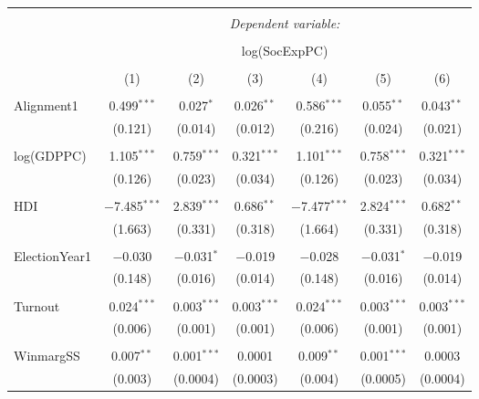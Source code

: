 
\begin{table}[!htbp] \centering 
  \caption{} 
  \label{} 
\begin{tabular}{@{\extracolsep{5pt}}lcccccc} 
\\[-1.8ex]\hline 
\hline \\[-1.8ex] 
 & \multicolumn{6}{c}{\textit{Dependent variable:}} \\ 
\cline{2-7} 
\\[-1.8ex] & \multicolumn{6}{c}{log(SocExpPC)} \\ 
\\[-1.8ex] & (1) & (2) & (3) & (4) & (5) & (6)\\ 
\hline \\[-1.8ex] 
 Alignment1 & 0.499$^{***}$ & 0.027$^{*}$ & 0.026$^{**}$ & 0.586$^{***}$ & 0.055$^{**}$ & 0.043$^{**}$ \\ 
  & (0.121) & (0.014) & (0.012) & (0.216) & (0.024) & (0.021) \\ 
  & & & & & & \\ 
 log(GDPPC) & 1.105$^{***}$ & 0.759$^{***}$ & 0.321$^{***}$ & 1.101$^{***}$ & 0.758$^{***}$ & 0.321$^{***}$ \\ 
  & (0.126) & (0.023) & (0.034) & (0.126) & (0.023) & (0.034) \\ 
  & & & & & & \\ 
 HDI & $-$7.485$^{***}$ & 2.839$^{***}$ & 0.686$^{**}$ & $-$7.477$^{***}$ & 2.824$^{***}$ & 0.682$^{**}$ \\ 
  & (1.663) & (0.331) & (0.318) & (1.664) & (0.331) & (0.318) \\ 
  & & & & & & \\ 
 ElectionYear1 & $-$0.030 & $-$0.031$^{*}$ & $-$0.019 & $-$0.028 & $-$0.031$^{*}$ & $-$0.019 \\ 
  & (0.148) & (0.016) & (0.014) & (0.148) & (0.016) & (0.014) \\ 
  & & & & & & \\ 
 Turnout & 0.024$^{***}$ & 0.003$^{***}$ & 0.003$^{***}$ & 0.024$^{***}$ & 0.003$^{***}$ & 0.003$^{***}$ \\ 
  & (0.006) & (0.001) & (0.001) & (0.006) & (0.001) & (0.001) \\ 
  & & & & & & \\ 
 WinmargSS & 0.007$^{**}$ & 0.001$^{***}$ & 0.0001 & 0.009$^{**}$ & 0.001$^{***}$ & 0.0003 \\ 
  & (0.003) & (0.0004) & (0.0003) & (0.004) & (0.0005) & (0.0004) \\ 

\end{tabular}
\end{table}
